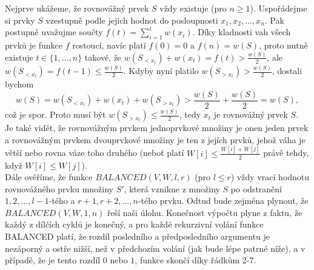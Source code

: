 \documentclass[12pt,a4paper]{article}
\theoremstyle{plain}
\begin{document}
Nejprve ukážeme, že rovnovážný prvek $S$ vždy existuje (pro $n\geq 1$). Uspořádejme si prvky $S$ vzestupně podle jejich hodnot do posloupnosti $x_1,x_2,\dots,x_n$. Pak postupně uvažujme součty $f(t)=\sum_{i=1}^{t} w(x_i)$. Díky kladnosti vah všech prvků je funkce $f$ rostoucí, navíc platí $f(0)=0$ a $f(n)=w(S)$, proto nutně existuje $t\in\{1,\dots,n\}$ takové, že $w(S_{<x_t})+w(x_t)=f(t)>\frac{w(S)}{2}$, ale $w(S_{<x_t})=f(t-1)\leq\frac{w(S)}{2}$. Kdyby nyní platilo $w(S_{>x_t})>\frac{w(S)}{2}$, dostali bychom
$$w(S)=w(S_{<x_t})+w(x_t)+w(S_{>x_t})>\frac{w(S)}{2}+\frac{w(S)}{2}=w(S),$$
což je spor. Proto musí být $w(S_{>x_t})\leq\frac{w(S)}{2}$, tedy $x_t$ je rovnovážný prvek $S$.\\

Je také vidět, že rovnovážným prvkem jednoprvkové množiny je onen jeden prvek a rovnovážným prvkem dvouprvkové množiny je ten z jejích prvků, jehož váha je větší nebo rovna váze toho druhého (neboť platí $W[i]\leq \frac{W[i]+W[j]}{2}$ právě tehdy, když $W[i]\leq W[j]$).\\

Dále ověříme, že funkce $BALANCED(V,W,l,r)$ (pro $l\leq r$) vždy vrací hodnotu rovnovážného prvku množiny $S'$, která vznikne z množiny $S$ po odstranění $1,2,\dots,l-1$-tého a $r+1,r+2,\dots,n$-tého prvku. Odtud bude zejména plynout, že $BALANCED(V,W,1,n)$ řeší naši úlohu. Konečnost výpočtu plyne z faktu, že každý z dílčích cyklů je konečný, a pro každé rekurzivní volání funkce BALANCED platí, že rozdíl posledního a předposledního argumentu je nezáporný a ostře nižší, než v předchozím volání (jak bude lépe patrné níže), a v případě, že je tento rozdíl $0$ nebo $1$, funkce skončí díky řádkům 2-7.\\
\end{document}
